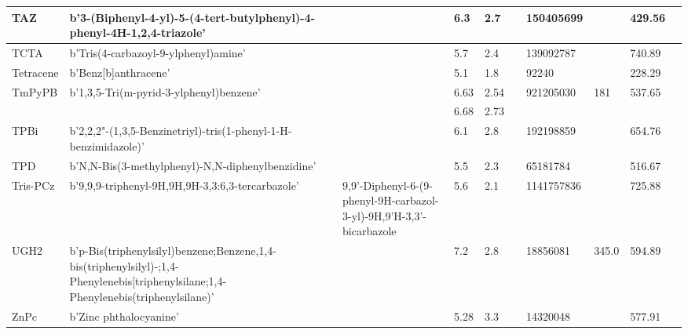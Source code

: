 \documentclass[../thesis.tex]{subfiles}
\begin{document}
\begin{landscape}
\begin{longtable}{| p{} | p{} | p{} | p{} | p{} | p{} | p{} | p{} | p{} | p{} | }
 \hline 
TAZ & b'3-(Biphenyl-4-yl)-5-(4-tert-butylphenyl)-4-phenyl-4H-1,2,4-triazole' &  & 6.3 & 2.7 &  & 150405699 &  & 429.56 &  \\ 
 
 \hline 
TCTA & b'Tris(4-carbazoyl-9-ylphenyl)amine' &  & 5.7 & 2.4 &  & 139092787 &  & 740.89 &  \\ 
 
 \hline 
Tetracene & b'Benz[b]anthracene' &  & 5.1 & 1.8 &  & 92240 &  & 228.29 &  \\ 
 
 \hline 
TmPyPB & b'1,3,5-Tri(m-pyrid-3-ylphenyl)benzene' &  & 6.63 & 2.54 &  & 921205030 & 181 & 537.65 &  \\ 
 & &  & 6.68 & 2.73 &  &  & & & \\ 
 
 \hline 
TPBi & b'2,2,2"-(1,3,5-Benzinetriyl)-tris(1-phenyl-1-H-benzimidazole)' &  & 6.1 & 2.8 &  & 192198859 &  & 654.76 &  \\ 
 
 \hline 
TPD & b'N,N-Bis(3-methylphenyl)-N,N-diphenylbenzidine' &  & 5.5 & 2.3 &  & 65181784 &  & 516.67 &  \\ 
 
 \hline 
Tris-PCz & b'9,9,9-triphenyl-9H,9H,9H-3,3:6,3-tercarbazole' & 9,9'-Diphenyl-6-(9-phenyl-9H-carbazol-3-yl)-9H,9'H-3,3'-bicarbazole & 5.6 & 2.1 &  & 1141757836 &  & 725.88 &  \\ 
 
 \hline 
UGH2 & b'p-Bis(triphenylsilyl)benzene;Benzene,1,4-bis(triphenylsilyl)-;1,4-Phenylenebis[triphenylsilane;1,4-Phenylenebis(triphenylsilane)' &  & 7.2 & 2.8 &  & 18856081 & 345.0 & 594.89 &  \\ 
 
 \hline 
ZnPc & b'Zinc phthalocyanine' &  & 5.28 & 3.3 &  & 14320048 &  & 577.91 &  \\ 
 
 \hline 
\end{longtable}\end{landscape}\normalsize
\end{document}

